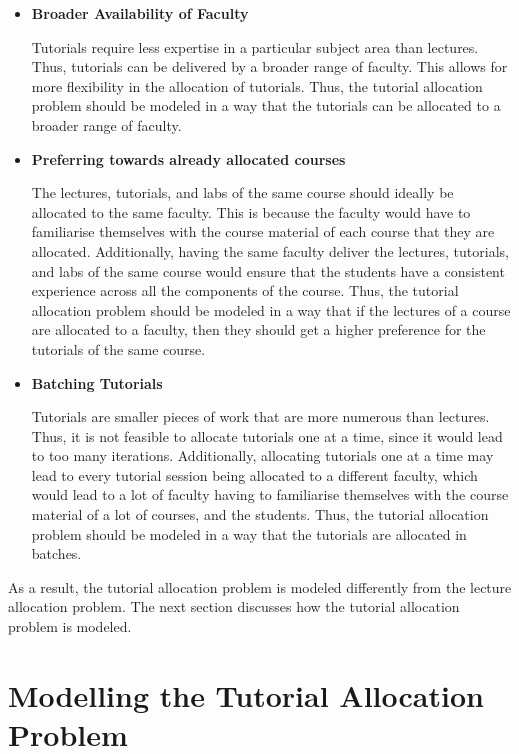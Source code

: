 \begin{itemize}
  \item \textbf{Broader Availability of Faculty}

        Tutorials require less expertise in a particular subject area than lectures. Thus, tutorials can be delivered by a broader range of faculty. This allows for more flexibility in the allocation of tutorials. Thus, the tutorial allocation problem should be modeled in a way that the tutorials can be allocated to a broader range of faculty.

  \item \textbf{Preferring towards already allocated courses}

        The lectures, tutorials, and labs of the same course should ideally be allocated to the same faculty. This is because the faculty would have to familiarise themselves with the course material of each course that they are allocated. Additionally, having the same faculty deliver the lectures, tutorials, and labs of the same course would ensure that the students have a consistent experience across all the components of the course. Thus, the tutorial allocation problem should be modeled in a way that if the lectures of a course are allocated to a faculty, then they should get a higher preference for the tutorials of the same course.

  \item \textbf{Batching Tutorials}

        Tutorials are smaller pieces of work that are more numerous than lectures. Thus, it is not feasible to allocate tutorials one at a time, since it would lead to too many iterations. Additionally, allocating tutorials one at a time may lead to every tutorial session being allocated to a different faculty, which would lead to a lot of faculty having to familiarise themselves with the course material of a lot of courses, and the students. Thus, the tutorial allocation problem should be modeled in a way that the tutorials are allocated in batches.

\end{itemize}

As a result, the tutorial allocation problem is modeled differently from the lecture allocation problem. The next section discusses how the tutorial allocation problem is modeled.

\section{Modelling the Tutorial Allocation Problem}


